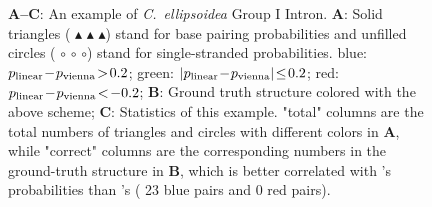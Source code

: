 \begin{figure}[!t]

\vspace{-2cm}
\caption{
{\bf A--C}: An example of {\it C.~ellipsoidea} Group I Intron. 
{\bf A}: Solid triangles ({\small {\color{blue} $\blacktriangle$} {\color{darkgreen}$\blacktriangle$}  {\color{red}$\blacktriangle$}}) stand for base pairing probabilities and
unfilled circles ({\small {\color{blue} $\circ$} {\color{darkgreen}$\circ$}  {\color{red}$\circ$}})  stand for single-stranded probabilities.
{\color{blue} blue: $p_\mathrm{linear} \!-\! p_\mathrm{vienna} \!>\! 0.2$};
{\color{darkgreen} green: $|p_\mathrm{linear} \!-\! p_\mathrm{vienna}| \!\leq \!0.2$};
{\color{red} red: $p_\mathrm{linear} \!-\! p_\mathrm{vienna} \!<\! -0.2$};
	{\bf B}: Ground truth structure colored with the above scheme; %
	{\bf C}: Statistics of this example. 
	"total" columns are the total numbers of triangles and circles with different colors in {\bf A},
	while "correct" columns are the corresponding numbers %
        in the ground-truth structure  in {\bf B},
        which is better correlated with \linearpartition's probabilities than \viennarnafold's ({\color{blue} 23 blue pairs} and {\color{red} 0 red pairs}). %
	\label{fig:example}\\[-.7cm]
}
\end{figure}

